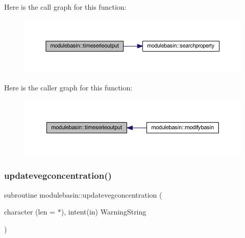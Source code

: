 Here is the call graph for this function\+:\nopagebreak
\begin{figure}[H]
\begin{center}
\leavevmode
\includegraphics[width=350pt]{namespacemodulebasin_a5d090cabe217c5ee21e1b627217a129f_cgraph}
\end{center}
\end{figure}
Here is the caller graph for this function\+:\nopagebreak
\begin{figure}[H]
\begin{center}
\leavevmode
\includegraphics[width=350pt]{namespacemodulebasin_a5d090cabe217c5ee21e1b627217a129f_icgraph}
\end{center}
\end{figure}
\mbox{\label{namespacemodulebasin_a73f54ad66e54b432898b7261a7ba0969}} 
\subsubsection{\texorpdfstring{updatevegconcentration()}{updatevegconcentration()}}
{\footnotesize\ttfamily subroutine modulebasin\+::updatevegconcentration (\begin{DoxyParamCaption}\item[{character (len = $\ast$), intent(in)}]{Warning\+String }\end{DoxyParamCaption})\hspace{0.3cm}{\ttfamily [private]}}

